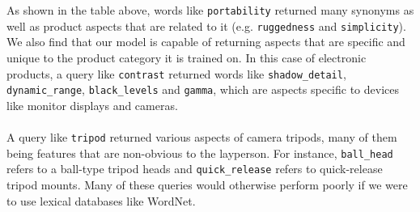 \documentclass{article} %
\begin{document}


As shown in the table above, words like \texttt{portability} returned many synonyms as well as product aspects that are related to it (e.g. \texttt{ruggedness} and \texttt{simplicity}). We also find that our model is capable of returning aspects that are specific and unique to the product category it is trained on. In this case of electronic products, a query like \texttt{contrast} returned words like \texttt{shadow\_detail}, \texttt{dynamic\_range}, \texttt{black\_levels} and \texttt{gamma}, which are aspects specific to devices like monitor displays and cameras.\\
\\
A query like \texttt{tripod} returned various aspects of camera tripods, many of them being features that are non-obvious to the layperson. For instance, \texttt{ball\_head} refers to a ball-type tripod heads and \texttt{quick\_release} refers to quick-release tripod mounts. Many of these queries would otherwise perform poorly if we were to use lexical databases like WordNet.
\end{document}
